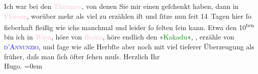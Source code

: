            \pstart
           Ich war bei den \textcolor{pink}{Thürmen}, von
                    denen Sie mir einen geſchenkt haben, dann in
                        \textcolor{pink}{Florenz}, worüber mehr als viel zu erzählen
                    iſt und ſitze nun ſeit 14 Tagen hier ſo fieberhaft fleißig wie ichs manchmal und
                    leider ſo ſelten ſein kann. Etwa den 10\textsuperscript{ten} bin ich
                    in \textcolor{pink}{Wien}, höre von \textcolor{pink}{Berlin}, höre endlich den »\textcolor{green}{Kakadu}«,
                        \label{K_L00849_1v}\label{K_L00849_1h}, erzähle von \textcolor{blue}{\textsc{d’Annunzio}}, und ſage wie {\pb}alle
                    Herbſte aber noch mit viel tieferer Überzeugung als früher, daſs man ſich öfter
                    ſehen muſs.\pend
           \pstart
           Herzlich Ihr{\\[\baselineskip]}\spacefill\mbox{Hugo.}\pend
           \leftskip=0em{}\endnumbering{}  